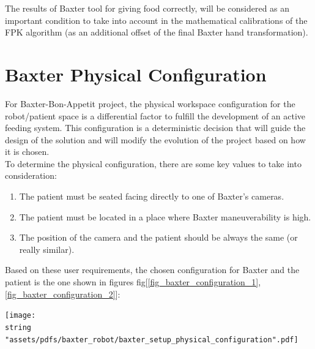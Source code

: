 \documentclass[11pt]{report} %
\begin{document}
The results of Baxter tool for giving food correctly, will be considered as an important condition to take into account in the mathematical calibrations of the FPK algorithm (as an additional offset of the final Baxter hand transformation).\\

\section{Baxter Physical Configuration}

For Baxter-Bon-Appetit project, the physical workspace configuration for the robot/patient space is a differential factor to fulfill the development of an active feeding system. This configuration is a deterministic decision that will guide the design of the solution and will modify the evolution of the project based on how it is chosen.\\

To determine the physical configuration, there are some key values to take into consideration:

\begin{enumerate}
    \item The patient must be seated facing directly to one of Baxter's cameras.
    \item The patient must be located in a place where Baxter maneuverability is high.
    \item The position of the camera and the patient should be always the same (or really similar).
\end{enumerate}

Based on these user requirements, the chosen configuration for Baxter and the patient is the one shown in figures fig[\ref{fig_baxter_configuration_1},\ref{fig_baxter_configuration_2}]:

\begin{center}
\texttt{[image: \\string "assets/pdfs/baxter\_robot/baxter\_setup\_physical\_configuration".pdf]}
\bigbreak
\begin{minipage}{\linewidth} %
\label{fig_baxter_configuration_1}
\end{minipage} \end{center}
\end{document}
